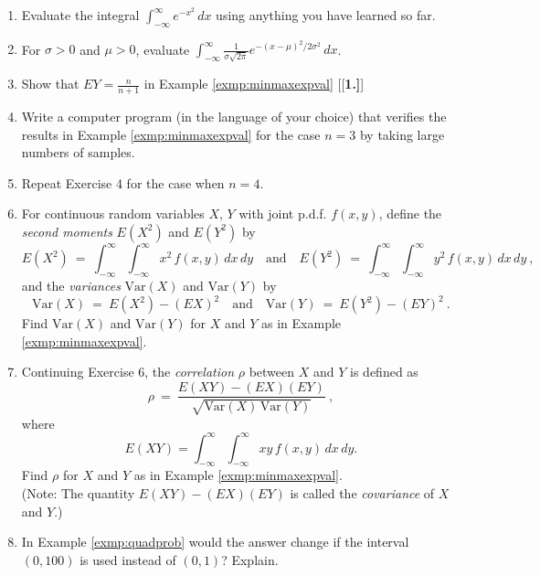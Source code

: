 \begin{enumerate}[\bfseries 1.]
 \item Evaluate the integral $\int_{-\infty}^{\infty} e^{-x^2}\,dx$ using anything you have learned so far.
 \item For $\sigma > 0$ and $\mu > 0$, evaluate $\int_{-\infty}^{\infty} \frac{1}{\sigma \sqrt{2\pi}}
  e^{-(x-\mu)^2 /2\sigma^2 } \,dx$.
 \item Show that $EY = \frac{n}{n+1}$ in Example \ref{exmp:minmaxexpval}
[{[\bfseries 1.]}]
 \item Write a computer program (in the language of your choice) that verifies the results in Example
 \ref{exmp:minmaxexpval} for the case $n=3$ by taking large numbers of samples.
 \item Repeat Exercise 4 for the case when $n=4$.
 \item For continuous random variables $X$, $Y$ with joint p.d.f. $f(x,y)$, define the \emph{second moments}
  $E(X^2 )$ and $E(Y^2 )$ by
  \begin{displaymath}
   E(X^2 ) ~=~ \int_{-\infty}^{\infty} \int_{-\infty}^{\infty} x^2 \,f(x,y)\,dx\,dy \quad\text{and}\quad
   E(Y^2 ) ~=~ \int_{-\infty}^{\infty} \int_{-\infty}^{\infty} y^2 \,f(x,y)\,dx\,dy ~,
  \end{displaymath}
  and the \emph{variances} $\text{Var}(X)$ and $\text{Var}(Y)$ by
  \begin{displaymath}
   \text{Var}(X) ~=~ E(X^2 ) - (EX)^2 \quad\text{and}\quad \text{Var}(Y) ~=~ E(Y^2 ) - (EY)^2 ~.
  \end{displaymath}
  Find $\text{Var}(X)$ and $\text{Var}(Y)$ for $X$ and $Y$ as in Example \ref{exmp:minmaxexpval}.
 \item Continuing Exercise 6, the \emph{correlation} $\rho$ between $X$ and $Y$ is defined as
  \begin{displaymath}
   \rho ~=~ \frac{E(XY) - (EX)(EY)}{\sqrt{\text{Var}(X)\,\text{Var}(Y)}} ~,
  \end{displaymath}
  where \[E(XY) = \int_{-\infty}^{\infty} \int_{-\infty}^{\infty}xy \,f(x,y)\,dx\,dy.\] 
  Find $\rho$ for
  $X$ and $Y$ as in Example \ref{exmp:minmaxexpval}.\\(Note: The quantity $E(XY) - (EX)(EY)$ is called the
  \emph{covariance} of $X$ and $Y$.)
 \item In Example \ref{exmp:quadprob} would the answer change if the interval $(0,100)$ is used instead of
  $(0,1)$? Explain.
\end{enumerate}
